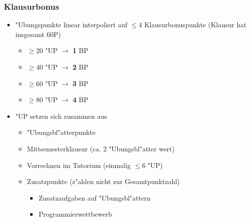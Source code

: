 \documentclass[t]{beamer}
\begin{document}
\begin{frame}
  \frametitle{Klausurbonus}
  \begin{itemize}
    \item "Ubungspunkte linear interpoliert auf $\leq 4$ Klausurbonuspunkte
          (Klausur hat insgesamt 60P)
      \begin{itemize}
      \item $\geq 20$ "UP $\rightarrow$ \textbf{1} BP
      \item $\geq 40$ "UP $\rightarrow$ \textbf{2} BP
      \item $\geq 60$ "UP $\rightarrow$ \textbf{3} BP
      \item $\geq 80$ "UP $\rightarrow$ \textbf{4} BP
      \end{itemize}
    \item "UP setzen sich zusammen aus
      \begin{itemize}
      \item "Ubungsbl"atterpunkte
      \item Mittsemesterklausur (ca. 2 "Ubungsbl"atter wert)
      \item Vorrechnen im Tutorium (einmalig $\leq 6$ "UP)
      \item Zusatzpunkte (z"ahlen nicht zur Gesamtpunktzahl)
        \begin{itemize}
        \item Zusatzaufgaben auf "Ubungsbl"attern
        \item Programmierwettbewerb
        \end{itemize}
      \end{itemize}
  \end{itemize}
\end{frame}
\end{document}
